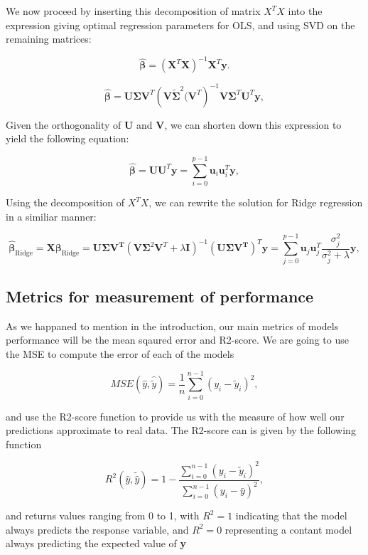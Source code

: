\documentclass[a4paper, 10pt]{article}
\begin{document}
We now proceed by inserting this decomposition of matrix $X^TX$ into the expression giving optimal regression parameters for OLS, and using SVD on the remaining matrices: 

$$
\hat{\boldsymbol{\beta}} = \left(\boldsymbol{X}^T\boldsymbol{X}\right)^{-1}\boldsymbol{X}^T\boldsymbol{y}.
$$

$$
\hat{\boldsymbol{\beta}} = \boldsymbol{U}\boldsymbol{\Sigma}\boldsymbol{V}^T\left(\boldsymbol{V}\tilde{\boldsymbol{\Sigma}}^{2}(\boldsymbol{V}^T\right)^{-1}\boldsymbol{V}\boldsymbol{\Sigma}^T\boldsymbol{U}^T\boldsymbol{y},
$$

Given the orthogonality of $\boldsymbol{U}$ and $\boldsymbol{V}$, we can shorten down this expression to yield the following equation: 

$$
\hat{\boldsymbol{\beta}}=\boldsymbol{U}\boldsymbol{U}^T\boldsymbol{y}=\sum_{i=0}^{p-1}\boldsymbol{u}_i\boldsymbol{u}^T_i\boldsymbol{y},
$$

Using the decomposition of $X^TX$, we can rewrite the solution for Ridge regression in a similiar manner:

$$
\hat{\boldsymbol{\beta}}_{\mathrm{Ridge}}=\boldsymbol{X}\boldsymbol{\beta}_{\mathrm{Ridge}} = \boldsymbol{U\Sigma V^T}\left(\boldsymbol{V}\boldsymbol{\Sigma}^2\boldsymbol{V}^T+\lambda\boldsymbol{I} \right)^{-1}(\boldsymbol{U\Sigma V^T})^T\boldsymbol{y}=\sum_{j=0}^{p-1}\boldsymbol{u}_j\boldsymbol{u}_j^T\frac{\sigma_j^2}{\sigma_j^2+\lambda}\boldsymbol{y},
$$

\subsection{Metrics for measurement of performance}
As we happaned to mention in the introduction, our main metrics of models performance will be the mean sqaured error and R2-score. We are going to use the MSE to compute the error of each of the models

$$
MSE(\hat{y},\hat{\tilde{y}}) = \frac{1}{n}
\sum_{i=0}^{n-1}(y_i-\tilde{y}_i)^2,
$$

and use the R2-score function to provide us with the measure of how well our predictions approximate to real data. The R2-score can is given by the following function 

$$
R^2(\hat{y}, \tilde{\hat{y}}) = 1 - \frac{\sum_{i=0}^{n - 1} (y_i - \tilde{y}_i)^2}{\sum_{i=0}^{n - 1} (y_i - \bar{y})^2},
$$

and returns values ranging from 0 to 1, with $R^2=1$ indicating that the model always predicts the response variable, and $R^2=0$ representing a contant model always predicting the expected value of \textbf{y}
\end{document}
